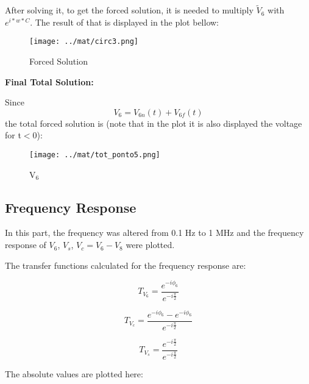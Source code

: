 
After solving it, to get the forced solution, it is needed to multiply $\tilde{V}_6$  with $e^{i*w*C}$. The result of that is displayed in the plot bellow:
\vspace{1cm}
\begin{figure}[h!]
   \texttt{[image: ../mat/circ3.png]}
    \centering
    \caption{Forced Solution}  %
    \label{nat}
\end{figure}

\vspace{2cm}

\textbf{Final Total Solution:}

Since $$ V_6 = V_{6n}(t) + V_{6f}(t) $$
the total forced solution is (note that in the plot it is also displayed the voltage for t$<$0): 



\begin{figure}[h!]
   \texttt{[image: ../mat/tot\_ponto5.png]}
    \centering
    \caption{V$_6$} 
    \label{v6}
\end{figure}


\vspace{1cm}



\vspace{3cm}
\subsection{Frequency Response}
\label{sec:2.4}
In this part, the frequency was altered from 0.1 Hz to 1 MHz and the frequency response of $V_6$, $V_s$, $V_c = V_6 - V_8$ were plotted.

The transfer functions calculated for the frequency response are:

\vspace{1cm}

$$ T_{V_6} = \frac{e^{-i\phi_6}}{e^{-i\frac{\pi}{2}}}$$

$$ T_{V_c} = \frac{e^{-i\phi_6} -e^{-i\phi_6}}{e^{-i\frac{\pi}{2}}}$$

$$ T_{V_s} = \frac{e^{-i\frac{\pi}{2}}}{e^{-i\frac{\pi}{2}}}$$

\vspace{1cm}

The absolute values are plotted here:

\vspace{1cm}

